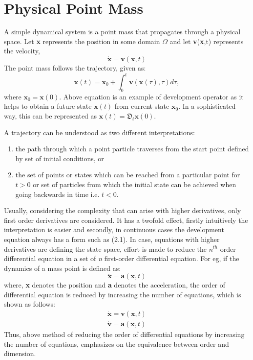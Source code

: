 \section{Physical Point Mass}
A simple dynamical system is a point mass that propagates through a physical space. Let \textbf{x} represents the position in some domain $\Omega$ and let \textbf{v}(\textbf{x},t) represents the velocity,
\begin{equation}
\dot{\mathbf{x}} = \textbf{v}(\textbf{x},t)
\end{equation}
The point mass follows the trajectory, given as:
\begin{equation}
\textbf{x}\left( \textit{t}\right) = \textbf{x}_{0} + \int_{0}^{t} \textbf{v}\left( \textbf{x}(\tau),\tau\right)d\tau ,
\end{equation}
where $\textbf{x}_{0}=\textbf{x}(0)$. Above equation is an example of development operator as it helps to obtain a future state $\textbf{x}(t)$ from current state $\textbf{x}_{0}$. In a sophisticated way, this can be represented as $\textbf{x}(t)=\mathfrak{D}_{t}\textbf{x}(0).$

A trajectory can be understood as two different interpretations:\renewcommand{\labelenumii}{\Roman{enumii}} \begin{enumerate}
\item the path through which a point particle traverses from the start point defined by set of initial conditions, or 
\item the set of points or states which can be reached from a particular point for $\textit{t} > 0$ or set of particles from which the initial state can be achieved when going backwards in time i.e. $\textit{t} < 0$. 
\end{enumerate}

Usually, considering the complexity that can arise with higher derivatives, only first order derivatives are considered. It has a twofold effect, firstly intuitively the interpretation is easier and secondly, in continuous cases the development equation always has a form such as (2.1). In case, equations with higher derivatives are defining the state space, effort is made to reduce the $\textit{n}^{th}$ order differential equation in a set of \textit{n} first-order differential equation. For eg, if the dynamics of a mass point is defined as:
\begin{equation}
\ddot{\mathbf{x}} = \textbf{a}(\textbf{x},t)
\end{equation}
where, \textbf{x} denotes the position and \textbf{a} denotes the acceleration, the order of differential equation is reduced by increasing the number of equations, which is shown as follows:
\begin{equation}
	\begin{split}
	\dot{\mathbf{x}} = \textbf{v}(\textbf{x},t) \\
	\dot{\mathbf{v}} = \textbf{a}(\textbf{x},t)
	\end{split}
\end{equation}
Thus, above method of reducing the order of differential equations by increasing the number of equations, emphasizes on the equivalence between order and dimension.

